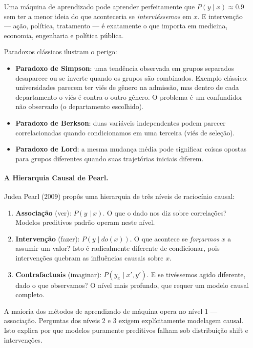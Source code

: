 \documentclass{tufte-handout}
\begin{document}
Uma máquina de aprendizado pode aprender perfeitamente que $P(y \mid x) \approx 0.9$
sem ter a menor ideia do que aconteceria se \textit{interviéssemos} em $x$. E
intervenção --- ação, política, tratamento --- é exatamente o que importa em
medicina, economia, engenharia e política pública.

Paradoxos clássicos ilustram o perigo:
\begin{itemize}
    \item \textbf{Paradoxo de Simpson}: uma tendência observada em grupos separados
    desaparece ou se inverte quando os grupos são combinados. Exemplo clássico:
    universidades parecem ter viés de gênero na admissão, mas dentro de cada
    departamento o viés é contra o outro gênero. O problema é um confundidor não
    observado (o departamento escolhido).
    \item \textbf{Paradoxo de Berkson}: duas variáveis independentes podem parecer
    correlacionadas quando condicionamos em uma terceira (viés de seleção).
    \item \textbf{Paradoxo de Lord}: a mesma mudança média pode significar coisas
    opostas para grupos diferentes quando suas trajetórias iniciais diferem.
\end{itemize}

\paragraph{A Hierarquia Causal de Pearl.}

Judea Pearl (2009) propôs uma hierarquia de três níveis de raciocínio causal:

\begin{enumerate}
    \item \textbf{Associação} (ver): $P(y \mid x)$. O que o dado nos diz sobre
    correlações? Modelos preditivos padrão operam neste nível.
    \item \textbf{Intervenção} (fazer): $P(y \mid do(x))$. O que acontece se
    \textit{forçarmos} $x$ a assumir um valor? Isto é radicalmente diferente de
    condicionar, pois intervenções quebram as influências causais sobre $x$.
    \item \textbf{Contrafactuais} (imaginar): $P(y_x \mid x', y')$. E se tivéssemos
    agido diferente, dado o que observamos? O nível mais profundo, que requer um
    modelo causal completo.
\end{enumerate}

\begin{remark}
    A maioria dos métodos de aprendizado de máquina opera no nível 1 --- associação.
    Perguntas dos níveis 2 e 3 exigem explícitamente modelagem causal. Isto explica
    por que modelos puramente preditivos falham sob distribuição shift e intervenções.
\end{remark}
\end{document}
